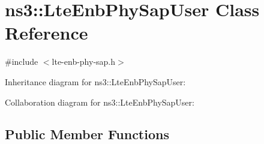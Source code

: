 \hypertarget{classns3_1_1LteEnbPhySapUser}{}\section{ns3\+:\+:Lte\+Enb\+Phy\+Sap\+User Class Reference}
\label{classns3_1_1LteEnbPhySapUser}


{\ttfamily \#include $<$lte-\/enb-\/phy-\/sap.\+h$>$}



Inheritance diagram for ns3\+:\+:Lte\+Enb\+Phy\+Sap\+User\+:


Collaboration diagram for ns3\+:\+:Lte\+Enb\+Phy\+Sap\+User\+:
\subsection*{Public Member Functions}
